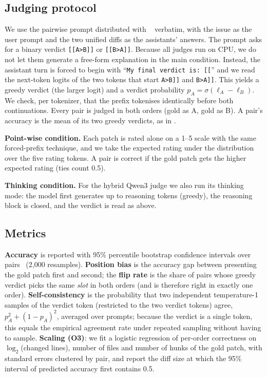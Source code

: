 \subsection{Judging protocol}
We use the pairwise prompt distributed with
\CJB{}~\cite{jiang2025codejudgebench} verbatim, with the issue as the user
prompt and the two unified diffs as the assistants' answers.  The prompt asks
for a binary verdict \texttt{[[A>B]]} or \texttt{[[B>A]]}.  Because all judges
run on CPU, we do not let them generate a free-form explanation in the main
condition.  Instead, the assistant turn is forced to begin with
``\texttt{My final verdict is: [[}'' and we read the next-token logits of the
two tokens that start \texttt{A>B]]} and \texttt{B>A]]}.  This yields a greedy
verdict (the larger logit) and a verdict probability
$p_A=\sigma(\ell_A-\ell_B)$.  We check, per tokenizer, that the prefix tokenises
identically before both continuations.  Every pair is judged in both orders
(gold as A, gold as B).  A pair's accuracy is the mean of its two greedy
verdicts, as in \CJB{}.

\textbf{Point-wise condition.}  Each patch is rated alone on a 1--5 scale with
the same forced-prefix technique, and we take the expected rating under the
distribution over the five rating tokens.  A pair is correct if the gold patch
gets the higher expected rating (ties count 0.5).

\textbf{Thinking condition.}  For the hybrid Qwen3 judge we also run its
thinking mode: the model first generates up to \ThinkBudget{} reasoning tokens
(greedy), the reasoning block is closed, and the verdict is read as above.

\subsection{Metrics}
\textbf{Accuracy} is reported with 95\% percentile bootstrap confidence
intervals over pairs~\cite{efron1979bootstrap} (2{,}000 resamples).
\textbf{Position bias} is the accuracy gap between presenting the gold patch
first and second; the \textbf{flip rate} is the share of pairs whose greedy
verdict picks the same \emph{slot} in both orders (and is therefore right in
exactly one order).  \textbf{Self-consistency} is the probability that two
independent temperature-1 samples of the verdict token (restricted to the two
verdict tokens) agree,
$p_A^2+(1-p_A)^2$, averaged over prompts; because the verdict is a single token,
this equals the empirical agreement rate under repeated sampling without having
to sample.  \textbf{Scaling (O3)}: we fit a logistic regression of per-order
correctness on $\log_2$(changed lines), number of files and number of hunks of
the gold patch, with standard errors clustered by pair, and report the diff size
at which the 95\% interval of predicted accuracy first contains 0.5.
